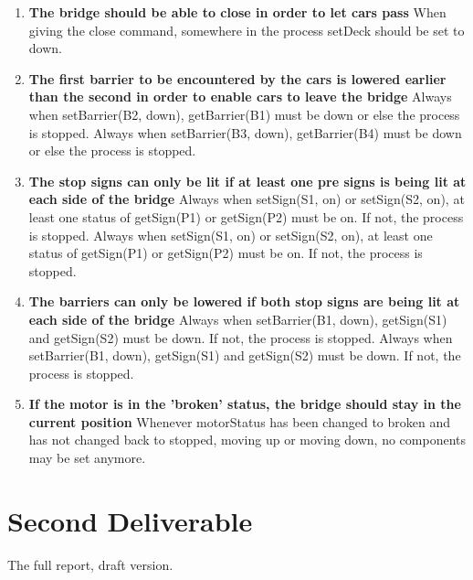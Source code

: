 \documentclass{article}
\begin{document}
\begin{enumerate}
	\item \textbf{The bridge should be able to close in order to let cars pass}
	When giving the close command, somewhere in the process setDeck should be set to down.

	\item \textbf{The first barrier to be encountered by the cars is lowered earlier than the second in order to enable cars to leave the bridge}
	Always when setBarrier(B2, down), getBarrier(B1) must be down or else the process is stopped. 
	Always when setBarrier(B3, down), getBarrier(B4) must be down or else the process is stopped. 

	\item \textbf{The stop signs can only be lit if at least one pre signs is being lit at each side of the bridge}
	Always when setSign(S1, on) or setSign(S2, on), at least one status of getSign(P1) or getSign(P2) must be on. If not, the process is stopped.
	Always when setSign(S1, on) or setSign(S2, on), at least one status of getSign(P1) or getSign(P2) must be on. If not, the process is stopped.

	\item \textbf{The barriers can only be lowered if both stop signs are being lit at each side of the bridge}
	Always when setBarrier(B1, down), getSign(S1) and getSign(S2) must be down. If not, the process is stopped.
	Always when setBarrier(B1, down), getSign(S1) and getSign(S2) must be down. If not, the process is stopped.

	\item \textbf{If the motor is in the 'broken' status, the bridge should stay in the current position}
	Whenever motorStatus has been changed to broken and has not changed back to stopped, moving up or moving down, no components may be set anymore.

\end{enumerate}

\section{Second Deliverable}

The full report, draft version.



%
%
%
%
%
\end{document}
